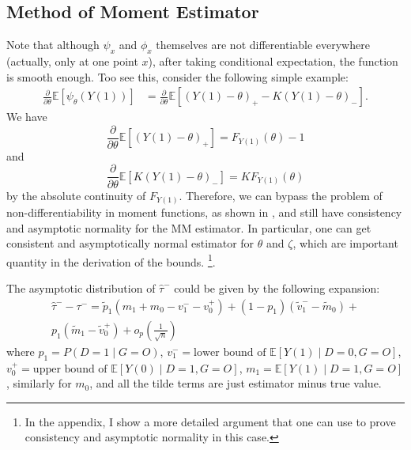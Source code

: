 \documentclass[12pt]{article}
\newcommand{\Ep}{\mathbb{E}}
\begin{document}
	\subsection{Method of Moment Estimator}
	Note that although $\psi_x$ and $\phi_x$ themselves are not differentiable everywhere (actually, only at one point $x$), after taking conditional expectation, the function is smooth enough. Too see this, consider the following simple example: 
		\begin{align*}
		\frac{\partial}{\partial \theta}\Ep[\psi_{\theta}(Y(1))] & = \frac{\partial}{\partial \theta} \Ep[(Y(1) - \theta)_+ - K (Y(1) - \theta)_-].
		\end{align*}
		We have
		$$\frac{\partial}{\partial \theta} \Ep[(Y(1) - \theta)_+] = F_{Y(1)}(\theta) - 1$$
		and 
		$$\frac{\partial}{\partial \theta} \Ep[K(Y(1) - \theta)_-] = K F_{Y(1)}(\theta) $$
		by the absolute continuity of $F_{Y(1)}$. Therefore, we can bypass the problem of non-differentiability in moment functions, as shown in \textcite{andrews1994asymptotics}, and still have consistency and asymptotic normality for the MM estimator. 
        In particular, one can get consistent and asymptotically normal estimator for $\theta$ and $\zeta$, which are important quantity in the derivation of the bounds. \footnote{In the appendix, I show a more detailed argument that one can use to prove consistency and asymptotic normality in this case.}.
	
	The asymptotic distribution of $\hat{\tau}^-$ could be given by the following expansion:
	\begin{equation}\label{eqn:deltamethod}
	    \begin{aligned}
            \hat{\tau}^{-} - \tau^- = \tilde{p}_1 (m_1 + m_0 - v_1^- - v_0^+) + (1- p_1)(\tilde{v}_1^- - \tilde{m}_0) + \\p_1 (\tilde{m}_1 - \tilde{v}_0^+) + o_p(\frac{1}{\sqrt{n}})
        \end{aligned}
	\end{equation}
    where $p_1 = P(D =1 \mid G = O)$, $v_1^- = \text{lower bound of } \mathbb{E}[Y(1) \mid D = 0, G = O]$, $v_0^+ = \text{upper bound of }\mathbb{E}[Y(0) \mid D = 1, G = O]$, $m_1 = \mathbb{E}[Y(1) \mid D = 1, G = O]$, similarly for $m_0$, and all the tilde terms are just estimator minus true value. 
    
\end{document}

